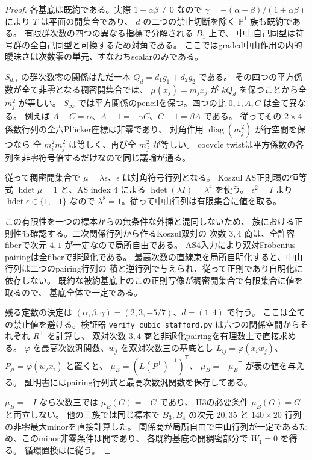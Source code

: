 \begin{proof}
各基底は既約である。実際 $1+\alpha\beta\ne0$ なので
$\gamma=-(\alpha+\beta)/(1+\alpha\beta)$ により $T$ は平面の開集合であり、
$d$ の二つの禁止切断を除く $\mathbb P^1$ 族も既約である。
有限群次数の四つの異なる指標で分解される $B_1$ 上で、
中山自己同型は符号群の全自己同型と可換するため対角である。
ここではgraded中山作用の内的曖昧さは次数零の単元、すなわちscalarのみである。

$S_{d,i}$ の群次数零の関係はただ一本 $Q_d=d_1g_1+d_2g_2$ である。
その四つの平方係数が全て非零となる稠密開集合では、
$\mu(x_j)=m_jx_j$ が $kQ_d$ を保つことから全 $m_j^2$ が等しい。
$S_\infty$ では平方関係のpencilを保つ。四つの比 $0,1,A,C$ は全て異なる。
例えば $A-C=\alpha$、$A-1=-\gamma C$、$C-1=\beta A$ である。
従ってその $2\times4$ 係数行列の全六Pl\"ucker座標は非零であり、
対角作用 $\operatorname{diag}(m_j^2)$ が行空間を保つなら
全 $m_i^2m_j^2$ は等しく、再び全 $m_j^2$ が等しい。
cocycle twistは平方係数の各列を非零符号倍するだけなので同じ議論が通る。

従って稠密開集合で $\mu=\lambda\epsilon$、$\epsilon$ は対角符号行列となる。
Koszul AS正則環の恒等式 $\operatorname{hdet}\mu=1$
\cite[Theorem 6.3]{RRZ} と、AS index $4$ による
$\operatorname{hdet}(\lambda I)=\lambda^4$ を使う。
$\epsilon^2=I$ より $\operatorname{hdet}\epsilon\in\{1,-1\}$ なので
$\lambda^8=1$。従って中山行列は有限集合に値を取る。

この有限性を一つの標本からの無条件な外挿と混同しないため、
族における正則性も確認する。二次関係行列から作るKoszul双対の
次数 $3,4$ 商は、全許容fiberで次元 $4,1$ が一定なので局所自由である。
AS4入力により双対Frobenius pairingは全fiberで非退化である。
最高次数の直線束を局所自明化すると、中山行列は二つのpairing行列の
積と逆行列で与えられ、従って正則であり自明化に依存しない。
既約な被約基底上のこの正則写像が稠密開集合で有限集合に値を取るので、
基底全体で一定である。

残る定数の決定は $(\alpha,\beta,\gamma)=(2,3,-5/7)$、$d=(1:4)$ で行う。
ここは全ての禁止値を避ける。検証器
\texttt{verify\_cubic\_stafford.py} は六つの関係空間からそれぞれ $R^\perp$ を計算し、
双対次数 $3,4$ 商と非退化pairingを有理数上で直接求める。
$\varphi$ を最高次数汎関数、$w_j$ を双対次数三の基底とし
$L_{ij}=\varphi(x_iw_j)$、$P_{ji}=\varphi(w_jx_i)$ と置くと、
$\mu_E=(L(P^{\mathsf T})^{-1})^{\mathsf T}$、
$\mu_B=-\mu_E^{-\mathsf T}$ が表の値を与える。
証明書にはpairing行列式と最高次数汎関数を保存してある。

$\mu_B=-I$ なら次数三では $\mu_B(G)=-G$ であり、
H3の必要条件 $\mu_B(G)=G$ と両立しない。
他の三族では同じ標本で $B_3,B_4$ の次元 $20,35$ と
$140\times20$ 行列の非零最大minorを直接計算した。
関係商が局所自由で中山行列が一定であるため、このminor非零条件は開であり、
各既約基底の開稠密部分で $W_1=0$ を得る。
循環置換は\cite[Lemma 6.1.11]{DaviesThesis}に従う。
\end{proof}

